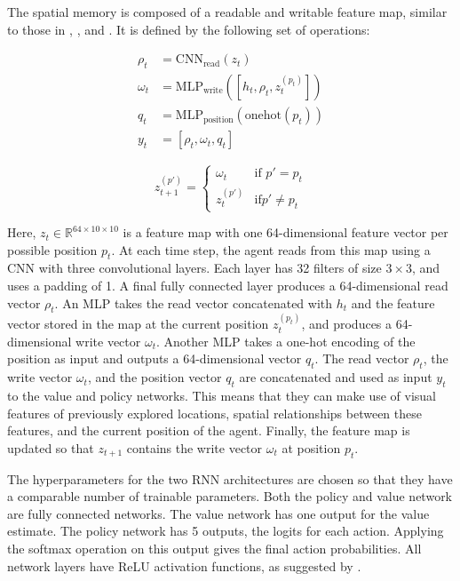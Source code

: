 The spatial memory is composed of a readable and writable feature map, similar to those in \cite{parisotto_salakhutdinov_2017}, \cite{henriques_vedaldi_2018}, \cite{gupta_cognitive_2019} and \cite{chaplot_semantic_2020}.
It is defined by the following set of operations:

\begin{align}
    \rho_t &= \text{CNN}_\text{read}(z_t) \\
    \omega_t &= \text{MLP}_\text{write}(\left\lbrack h_t, \rho_t, z_t^{(p_t)} \right\rbrack) \\
    q_t &= \text{MLP}_\text{position}(\text{onehot}(p_t)) \\
    y_t &= \left\lbrack \rho_t, \omega_t, q_t \right\rbrack
\end{align}

\begin{equation}    
    z_{t+1}^{(p')} =
    \begin{cases}
        \omega_t & \text{if } p' = p_t \\
        z_{t}^{(p')} & \text{if} p' \neq p_t
    \end{cases}
\end{equation}

Here, \(z_t \in \mathbb{R}^{64 \times 10 \times 10}\) is a feature map with one 64-dimensional feature vector per possible position \(p_t\).
At each time step, the agent reads from this map using a CNN with three convolutional layers.
Each layer has 32 filters of size \(3 \times 3\), and uses a padding of 1.
A final fully connected layer produces a 64-dimensional read vector \(\rho_t\).
An MLP takes the read vector concatenated with \(h_t\) and the feature vector stored in the map at the current position \(z_t^{(p_t)}\), and produces a 64-dimensional write vector \(\omega_{t}\).
Another MLP takes a one-hot encoding of the position as input and outputs a 64-dimensional vector \(q_t\).
The read vector \(\rho_t\), the write vector \(\omega_{t}\), and the position vector \(q_t\) are concatenated and used as input \(y_t\) to the value and policy networks.
This means that they can make use of visual features of previously explored locations, spatial relationships between these features, and the current position of the agent.
Finally, the feature map is updated so that \(z_{t+1}\) contains the write vector \(\omega_{t}\) at position \(p_t\).


The hyperparameters for the two RNN architectures are chosen so that they have a comparable number of trainable parameters.
Both the policy and value network are fully connected networks.
The value network has one output for the value estimate.
The policy network has 5 outputs, the logits for each action.
Applying the softmax operation on this output gives the final action probabilities.
All network layers have ReLU activation functions, as suggested by \cite{henderson_matters_2018}.

